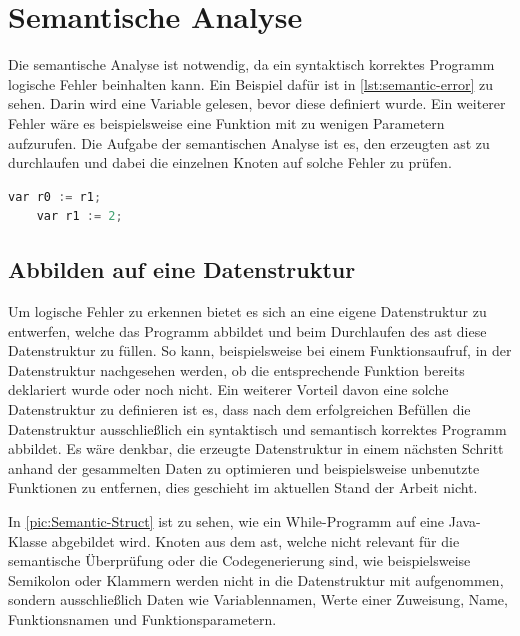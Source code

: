 \chapter{Semantische Analyse} \label{chap:semantic}

Die semantische Analyse ist notwendig, da ein syntaktisch korrektes Programm logische Fehler beinhalten kann. Ein Beispiel dafür ist in \cref{lst:semantic-error} zu sehen. Darin wird eine Variable gelesen, bevor diese definiert wurde. Ein weiterer Fehler wäre es beispielsweise eine Funktion mit zu wenigen Parametern aufzurufen. Die Aufgabe der semantischen Analyse ist es, den erzeugten \ac{ast} zu durchlaufen und dabei die einzelnen Knoten auf solche Fehler zu prüfen.

\begin{lstlisting}[language=c, caption=Beispiel für einen semantischen Fehler, label={lst:semantic-error}]
	var r0 := r1;
	var r1 := 2;
\end{lstlisting}

\section{Abbilden auf eine Datenstruktur}
Um logische Fehler zu erkennen bietet es sich an eine eigene Datenstruktur zu entwerfen, welche das Programm abbildet und beim Durchlaufen des \ac{ast} diese Datenstruktur zu füllen. So kann, beispielsweise bei einem Funktionsaufruf, in der Datenstruktur nachgesehen werden, ob die entsprechende Funktion bereits deklariert wurde oder noch nicht. Ein weiterer Vorteil davon eine solche Datenstruktur zu definieren ist es, dass nach dem erfolgreichen Befüllen die Datenstruktur ausschließlich ein syntaktisch und semantisch korrektes Programm abbildet. Es wäre denkbar, die erzeugte Datenstruktur in einem nächsten Schritt anhand der gesammelten Daten zu optimieren und beispielsweise unbenutzte Funktionen zu entfernen, dies geschieht im aktuellen Stand der Arbeit nicht. 

In \cref{pic:Semantic-Struct} ist zu sehen, wie ein While-Programm auf eine Java-Klasse abgebildet wird. Knoten aus dem \ac{ast}, welche nicht relevant für die semantische Überprüfung oder die Codegenerierung sind, wie beispielsweise Semikolon oder Klammern werden nicht in die Datenstruktur mit aufgenommen, sondern ausschließlich Daten wie  Variablennamen, Werte einer Zuweisung, Name, Funktionsnamen und Funktionsparametern.

